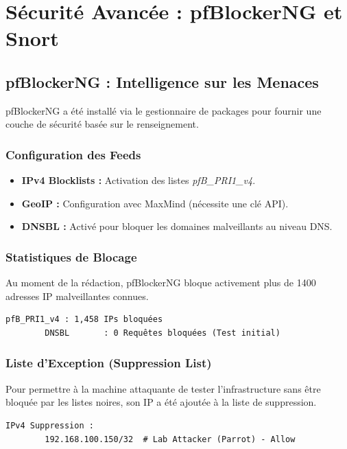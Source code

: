 \documentclass[12pt,a4paper,openany]{report}
\begin{document}
	\chapter{Sécurité Avancée : pfBlockerNG et Snort}
	
	\section{pfBlockerNG : Intelligence sur les Menaces}
	pfBlockerNG a été installé via le gestionnaire de packages pour fournir une couche de sécurité basée sur le renseignement.
	
	\subsection{Configuration des Feeds}
	\begin{itemize}
		\item \textbf{IPv4 Blocklists :} Activation des listes \textit{pfB\_PRI1\_v4}.
		\item \textbf{GeoIP :} Configuration avec MaxMind (nécessite une clé API).
		\item \textbf{DNSBL :} Activé pour bloquer les domaines malveillants au niveau DNS.
	\end{itemize}
	
	\subsection{Statistiques de Blocage}
	Au moment de la rédaction, pfBlockerNG bloque activement plus de 1400 adresses IP malveillantes connues.
	\begin{lstlisting}[caption=Statut pfBlockerNG Dashboard]
		pfB_PRI1_v4 : 1,458 IPs bloquées
		DNSBL       : 0 Requêtes bloquées (Test initial)
	\end{lstlisting}
	
	\subsection{Liste d'Exception (Suppression List)}
	Pour permettre à la machine attaquante de tester l'infrastructure sans être bloquée par les listes noires, son IP a été ajoutée à la liste de suppression.
	\begin{lstlisting}[caption=Configuration Suppression List]
		IPv4 Suppression :
		192.168.100.150/32  # Lab Attacker (Parrot) - Allow
	\end{lstlisting}
	
\end{document}
